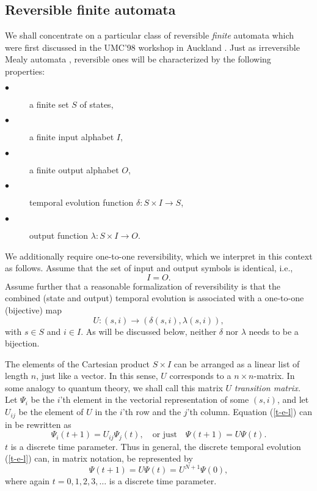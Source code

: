 \subsection*{Reversible finite automata}
We shall concentrate on a particular class of reversible {\em finite}
automata which were first discussed in the UMC'98 workshop in Auckland
\cite{sv-aut-rev}.
Just as irreversible Mealy automata \cite{hopcroft,brauer-84},
reversible ones will be
characterized by the following properties:
\begin{description}
\item[$\bullet$]
a finite set
$S$
of states,
\item[$\bullet$]
a finite input  alphabet $I$,
\item[$\bullet$]
a finite output alphabet $O$,
\item[$\bullet$]
temporal evolution function
$\delta :S\times I\rightarrow S$,
\item[$\bullet$]
output function
$\lambda :S\times I\rightarrow O$.
\end{description}


We additionally require one-to-one
reversibility,
which we interpret in this context as follows.  Assume that the set of
input and output symbols is identical, i.e.,
$$I=O.$$
Assume further that a reasonable formalization of reversibility is that
the combined (state and output) temporal evolution is associated with a
one-to-one
(bijective) map
\begin{equation}
U:(s,i)\rightarrow (\delta(s,i),\lambda (s,i)),
\label{t-e-l}
\end{equation}
with
$s\in S$ and $i\in I$.
As will be discussed below,
neither $\delta$ nor $\lambda$ needs to be a bijection.


The elements of the Cartesian product
$S\times I$ can be arranged as a linear list of length
$n$, just like a vector. In this sense,
$U$ corresponds to a $n\times n$-matrix.
In some analogy to quantum theory, we shall call this matrix $U$ {\em
transition matrix.} Let $\Psi_i$
be the $i$'th element in the vectorial representation of some
$(s,i)$, and let
$U_{ij}$ be the element
of
$U$ in the $i$'th row and the $j$'th column.
Equation (\ref{t-e-l}) can in be rewritten as
\begin{equation}
\Psi_i (t+1)= U_{ij}\Psi_j (t),
\label{t-e-l2a}
\quad \textrm{or just}\quad
\Psi (t+1)= U\Psi (t).
\label{t-e-l3}
\end{equation}
$t$ is a discrete time parameter.
Thus in general,
the discrete temporal evolution (\ref{t-e-l}) can, in matrix
notation, be represented by
\begin{equation}
\Psi (t+1)=U\Psi (t)=U^{N+1}\Psi (0),
\label{t-e-l2}
\end{equation}
where again $t=0,1,2,3,\ldots$ is a discrete time parameter.


